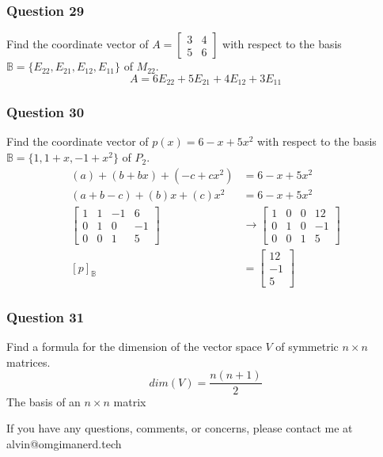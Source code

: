 \documentclass{math}
\begin{document}
\subsubsection*{Question 29}
Find the coordinate vector of \( A = \begin{bmatrix}3 & 4 \\ 5 & 6\end{bmatrix}
\) with respect to the basis \( \mathbb{B} = \{E_{22},E_{21},E_{12},E_{11}\} \)
of \( M_{22} \).
\[ A = 6E_{22}+5E_{21}+4E_{12}+3E_{11} \]

\subsubsection*{Question 30}
Find the coordinate vector of \( p(x)=6-x+5x^2 \) with respect to the basis
\( \mathbb{B} = \{1,1+x,-1+x^2\} \) of \( P_2 \).
\begin{align*}
  (a)+(b+bx)+(-c+cx^2) &= 6-x+5x^2 \\
  (a+b-c)+(b)x+(c)x^2 &= 6-x+5x^2 \\
  \left[\begin{array}{ccc|c}
    1 & 1 & -1 & 6 \\
    0 & 1 & 0 & -1 \\
    0 & 0 & 1 & 5
  \end{array}\right] &\to \left[\begin{array}{ccc|c}
    1 & 0 & 0 & 12 \\
    0 & 1 & 0 & -1 \\
    0 & 0 & 1 & 5
  \end{array}\right] \\
  [p]_{\mathbb{B}} &= \begin{bmatrix}12 \\ -1 \\ 5\end{bmatrix}
\end{align*}

\subsubsection*{Question 31}
Find a formula for the dimension of the vector space \( V \) of symmetric
\( n\times n \) matrices.
\[ dim(V) = \frac{n(n+1)}{2} \]
The basis of an \( n\times n \) matrix

\begin{center}
  If you have any questions, comments, or concerns, please contact me at
  alvin@omgimanerd.tech
\end{center}
\end{document}
